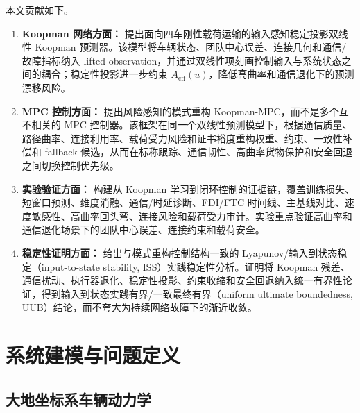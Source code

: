 \documentclass[twocolumn,3p,times,procedia]{elsarticle}
\begin{document}
本文贡献如下。
\begin{enumerate}
\item \textbf{Koopman 网络方面：} 提出面向四车刚性载荷运输的输入感知稳定投影双线性 Koopman 预测器。该模型将车辆状态、团队中心误差、连接几何和通信/故障指标纳入 lifted observation，并通过双线性项刻画控制输入与系统状态之间的耦合；稳定性投影进一步约束 $A_{\mathrm{eff}}(u)$，降低高曲率和通信退化下的预测漂移风险。
\item \textbf{MPC 控制方面：} 提出风险感知的模式重构 Koopman-MPC，而不是多个互不相关的 MPC 控制器。该框架在同一个双线性预测模型下，根据通信质量、路径曲率、连接利用率、载荷受力风险和证书裕度重构权重、约束、一致性补偿和 fallback 候选，从而在标称跟踪、通信韧性、高曲率货物保护和安全回退之间切换控制优先级。
\item \textbf{实验验证方面：} 构建从 Koopman 学习到闭环控制的证据链，覆盖训练损失、短窗口预测、维度消融、通信/时延诊断、FDI/FTC 时间线、主基线对比、速度敏感性、高曲率回头弯、连接风险和载荷受力审计。实验重点验证高曲率和通信退化场景下的团队中心误差、连接约束和载荷安全。
\item \textbf{稳定性证明方面：} 给出与模式重构控制结构一致的 Lyapunov/输入到状态稳定（input-to-state stability, ISS）实践稳定性分析。证明将 Koopman 残差、通信扰动、执行器退化、稳定性投影、约束收缩和安全回退纳入统一有界性论证，得到输入到状态实践有界/一致最终有界（uniform ultimate boundedness, UUB）结论，而不夸大为持续网络故障下的渐近收敛。
\end{enumerate}

\section{系统建模与问题定义}

\subsection{大地坐标系车辆动力学}
\end{document}
